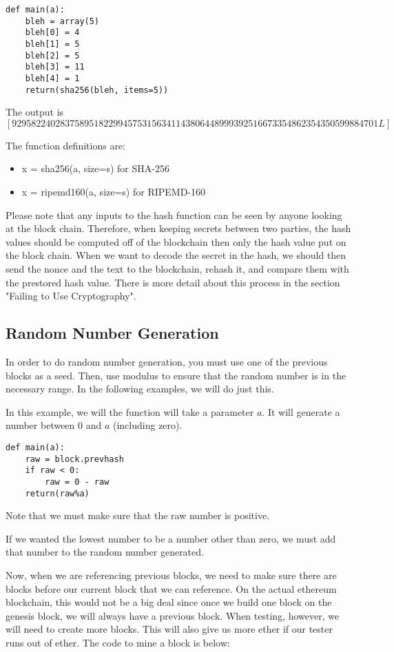 \documentclass[12pt]{article}
\begin{document}
\begin{lstlisting}
def main(a):
	bleh = array(5)
	bleh[0] = 4
	bleh[1] = 5
	bleh[2] = 5
	bleh[3] = 11
	bleh[4] = 1
	return(sha256(bleh, items=5))
\end{lstlisting}
The output is $[9295822402837589518229945753156341143806448999392516673354862354350599884701L]$

The function definitions are:
\begin{itemize}
	\item x = sha256(a, size=s) for SHA-256
	\item x = ripemd160(a, size=s) for RIPEMD-160
\end{itemize}

Please note that any inputs to the hash function can be seen by anyone looking at the block chain. Therefore, when keeping secrets between two parties, the hash values should be computed off of the blockchain then only the hash value put on the block chain. When we want to decode the secret in the hash, we should then send the nonce and the text to the blockchain, rehash it, and compare them with the prestored hash value. There is more detail about this process in the section "Failing to Use Cryptography".

\subsection{Random Number Generation}
In order to do random number generation, you must use one of the previous blocks as a seed. Then, use modulus to ensure that the random number is in the necessary range. In the following examples, we will do just this.

In this example, we will the function will take a parameter $a$. It will generate a number between 0 and $a$ (including zero).

\begin{lstlisting}
def main(a):
	raw = block.prevhash
	if raw < 0:
		raw = 0 - raw
	return(raw%a)
\end{lstlisting}

Note that we must make sure that the raw number is positive. \cite{PeterBorah 2014}

If we wanted the lowest number to be a number other than zero, we must add that number to the random number generated. 

Now, when we are referencing previous blocks, we need to make sure there are blocks before our current block that we can reference. On the actual ethereum blockchain, this would not be a big deal since once we build one block on the genesis block, we will always have a previous block. When testing, however, we will need to create more blocks. This will also give us more ether if our tester runs out of ether. The code to mine a block is below:
\end{document}
